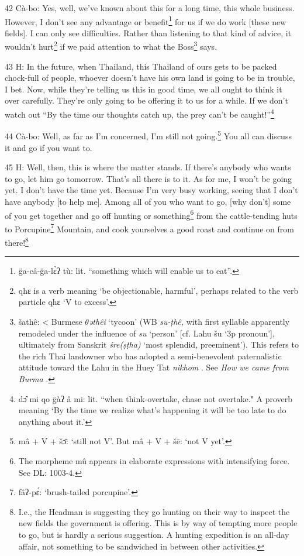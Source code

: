 42 Cà-bo: Yes, well, we've known about this for a long time, this whole business.
However, I don't see any advantage or benefit\footnote{g̈a-câ-g̈a-lɛ̀ʔ tù: lit. ``something which will enable us to eat''.} for us if we do work [these new
fields]. I can only see difficulties. Rather than listening to that kind of advice,
it wouldn't hurt\footnote{qhɛ is a verb meaning `be objectionable, harmful', perhaps related to the verb particle qhɛ `V to excess'.} if we paid attention to what the Boss\footnote{šathê: < Burmese  \textit{$\theta$əthêi } `tycoon' (WB  \textit{su-ṭhê, }with first syllable apparently remodeled under the influence of  \textit{su }`person' [cf. Lahu šu `3p pronoun'], ultimately from Sanskrit  \textit{śre(ṣṭha) } `most splendid, preeminent'). This refers to the rich Thai landowner who has adopted a semi-benevolent paternalistic attitude toward the Lahu in the Huey Tat \textit{nikhom }. See  \textit{How we came from Burma }.} says.

43 H: In the future, when Thailand, this Thailand of ours gets to be packed chock-full
of people, whoever doesn't have his own land is going to be in trouble, I bet.
Now, while they're telling us this in good time, we all ought to think it over
carefully. They're only going to be offering it to us for a while. If we don't
watch out ``By the time our thoughts catch up, the prey can't be caught!''\footnote{dɔ̂ mi qo g̈àʔ â mi: lit. ``when think-overtake, chase not overtake." A proverb meaning `By the time we realize what's happening it will be too late to do anything about it.'}

44 Cà-bo: Well, as far as I'm concerned, I'm still not going.\footnote{mâ + V + šɔ̄: `still not V'. But mâ + V + šē: `not V yet'.} You all can
discuss it and go if you want to.

45 H: Well, then, this is where the matter stands. If there's anybody who wants
to go, let him go tomorrow. That's all there is to it. As for me, I won't be going
yet. I don't have the time yet. Because I'm very busy working, seeing that I don't
have anybody [to help me]. Among all of you who want to go, [why don't] some of
you get together and go off hunting or something\footnote{The morpheme mû appears in elaborate expressions with intensifying force. See DL: 1003-4.} from the cattle-tending huts
to Porcupine\footnote{fâʔ-pɛ́: `brush-tailed porcupine'.} Mountain, and cook yourselves a good roast and continue on from
there!\footnote{I.e., the Headman is suggesting they go hunting on their way to inspect the new fields the government is offering. This is by way of tempting more people to go, but is hardly a serious suggestion. A hunting expedition is an all-day affair, not something to be sandwiched in between other activities.}

